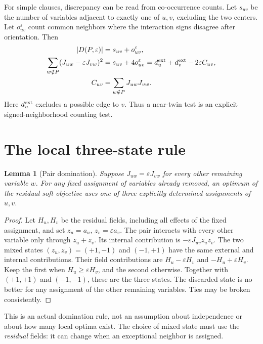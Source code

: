\documentclass[11pt,a4paper]{article}
\newtheorem{lemma}[theorem]{Lemma}
\begin{document}
For simple clauses, discrepancy can be read from co-occurrence counts.
Let $s_{uv}$ be the number of variables adjacent to exactly one of $u,v$,
excluding the two centers. Let $o_{uv}^{\varepsilon}$ count common
neighbors where the interaction signs disagree after orientation.
Then
\begin{align}
 |D(P,\varepsilon)|&=s_{uv}+o_{uv}^{\varepsilon},     \label{eq:dist}\\
 \sum_{w\notin P}(J_{uw}-\varepsilon J_{vw})^2
 &=s_{uv}+4o_{uv}^{\varepsilon}
  =d_u^{\rm ext}+d_v^{\rm ext}-2\varepsilon C_{uv}, \label{eq:gram}\\
 C_{uv}&=\sum_{w\notin P}J_{uw}J_{vw}.
\end{align}
Here $d_u^{\rm ext}$ excludes a possible edge to $v$. Thus a near-twin
test is an explicit signed-neighborhood counting test.

\section{The local three-state rule}

\begin{lemma}[Pair domination]\label{lem:pair}
Suppose $J_{uw}=\varepsilon J_{vw}$ for every other remaining variable
$w$. For any fixed assignment of variables already removed, an optimum
of the residual soft objective uses one of three explicitly determined
assignments of $u,v$.
\end{lemma}
\begin{proof}
Let $H_u,H_v$ be the residual fields, including all effects of the fixed
assignment, and set $z_u=a_u$, $z_v=\varepsilon a_v$.
The pair interacts with every other variable only through $z_u+z_v$.
Its internal contribution is $-\varepsilon J_{uv}z_uz_v$.
The two mixed states $(z_u,z_v)=(+1,-1)$ and $(-1,+1)$ have the same
external and internal contributions. Their field contributions are
$H_u-\varepsilon H_v$ and $-H_u+\varepsilon H_v$.
Keep the first when $H_u\ge\varepsilon H_v$, and the second otherwise.
Together with $(+1,+1)$ and $(-1,-1)$, these are the three states.
The discarded state is no better for any assignment of the other
remaining variables. Ties may be broken consistently.
\end{proof}

This is an actual domination rule, not an assumption about independence
or about how many local optima exist. The choice of mixed state must use
the \emph{residual} fields: it can change when an exceptional neighbor is
assigned.
\end{document}

